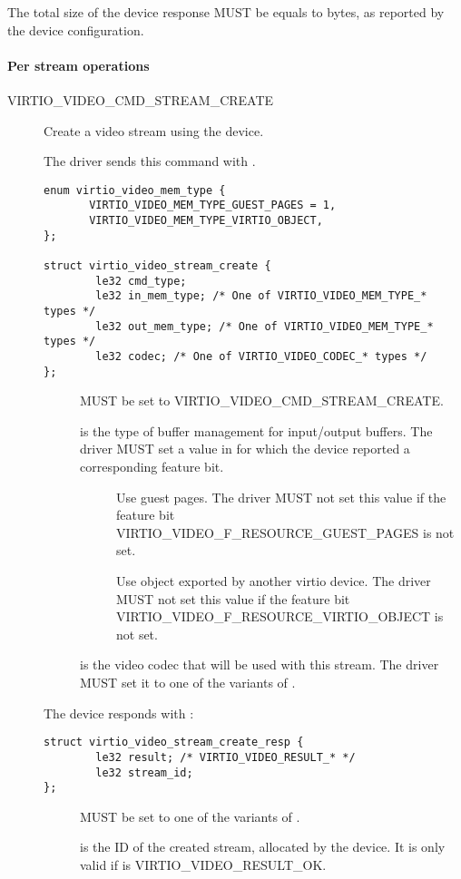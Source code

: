 The total size of the device response MUST be equals to 
bytes, as reported by the device configuration.

\paragraph{Per stream operations}

\begin{description}
\item[VIRTIO_VIDEO_CMD_STREAM_CREATE] Create a video stream using the device.

The driver sends this command with .
\begin{lstlisting}
enum virtio_video_mem_type {
       VIRTIO_VIDEO_MEM_TYPE_GUEST_PAGES = 1,
       VIRTIO_VIDEO_MEM_TYPE_VIRTIO_OBJECT,
};

struct virtio_video_stream_create {
        le32 cmd_type;
        le32 in_mem_type; /* One of VIRTIO_VIDEO_MEM_TYPE_* types */
        le32 out_mem_type; /* One of VIRTIO_VIDEO_MEM_TYPE_* types */
        le32 codec; /* One of VIRTIO_VIDEO_CODEC_* types */
};
\end{lstlisting}
\begin{description}
\item[] MUST be set to VIRTIO_VIDEO_CMD_STREAM_CREATE.
\item[] is the type of buffer management for
  input/output buffers. The driver MUST set a value in  for which the device reported a corresponding feature
  bit.
\begin{description}
\item[] Use guest pages. The driver
  MUST not set this value if the feature bit VIRTIO_VIDEO_F_RESOURCE_GUEST_PAGES
  is not set.
\item[] Use object exported by
  another virtio device. The driver MUST not set this value if the feature bit
  VIRTIO_VIDEO_F_RESOURCE_VIRTIO_OBJECT is not set.
\end{description}
\item[] is the video codec that will be used with this stream. The
  driver MUST set it to one of the variants of .
\end{description}

The device responds with :
\begin{lstlisting}
struct virtio_video_stream_create_resp {
        le32 result; /* VIRTIO_VIDEO_RESULT_* */
        le32 stream_id;
};
\end{lstlisting}
\begin{description}
\item[] MUST be set to one of the variants of .
\item[] is the ID of the created stream, allocated by the
  device. It is only valid if  is VIRTIO_VIDEO_RESULT_OK.
\end{description}


\end{description}
